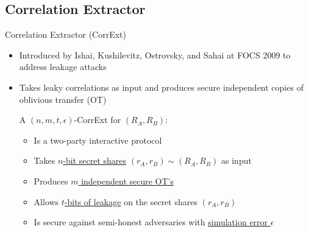 \subsection{Correlation Extractor}
\begin{frame}{Correlation Extractor (CorrExt)}
	\begin{itemize}
		\item Introduced by Ishai, Kushilevitz, Ostrovsky, and Sahai at FOCS 2009 \cite{FOCS:IKOS09} to address leakage attacks 
		\item Takes leaky correlations as input and produces secure independent
		copies of oblivious transfer (OT)
		\pause
		\begin{definition}
			A $ (n,m,t,\epsilon) $-CorrExt for $ (R_A, R_B) $: 
			\begin{itemize}
				\item Is a two-party interactive protocol	
				\item Takes \underline{$n$-bit secret shares} $ (r_A, r_B) \sim (R_A, R_B) $ as input
				\item Produces \underline{$ m $ independent secure OT's}
				\item Allows \underline{$ t $-bits of leakage} on the secret shares $ (r_A, r_B) $
				\item Is secure against semi-honest adversaries with \underline{simulation error $ \epsilon $}
			\end{itemize}
		\end{definition}
	\end{itemize}
\end{frame}
	

